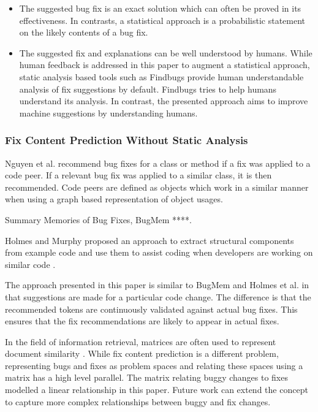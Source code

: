 \documentclass[10pt, conference, letterpaper, compsocconf]{IEEEtran}
\begin{document}
\begin{itemize}

\item The suggested bug fix is an exact solution which can often be proved
in its effectiveness. In contrasts, a statistical approach is a probabilistic
statement on the likely contents of a bug fix.

\item The suggested fix and explanations can be well understood by humans.
While human feedback is addressed in this paper to augment a statistical
approach, static analysis based tools such as Findbugs provide human
understandable analysis of fix suggestions by default. Findbugs tries
to help humans understand its analysis. In contrast, the presented
approach aims to improve machine suggestions by understanding humans.

\end{itemize}

\subsubsection{Fix Content Prediction Without Static Analysis}
Nguyen et al. \cite{nguyen2010recurring} recommend bug fixes for a class or method if a fix was applied to a code peer. If a relevant bug fix was applied to a similar class, it is then recommended. Code peers are defined as objects which work in a similar manner when using a graph based representation of object usages.

Summary Memories of Bug Fixes, BugMem ****.

Holmes and Murphy proposed an approach to extract structural components from example code and use them to assist coding when developers are working on similar code \cite{holmes2005using}.

The approach presented in this paper is similar to BugMem and Holmes et al. in that suggestions are made for a particular code change. The difference is that the recommended tokens are continuously validated against actual bug fixes. This ensures that the fix recommendations are likely to appear in actual fixes.

In the field of information retrieval, matrices are often used to represent document similarity \cite{rolleke2006general}. While fix content prediction is a different problem, representing bugs and fixes as problem spaces and relating these spaces using a matrix has a high level parallel. The matrix relating buggy changes to fixes modelled a linear relationship in this paper. Future work can extend the concept to capture more complex relationships between buggy and fix changes.
\end{document}
